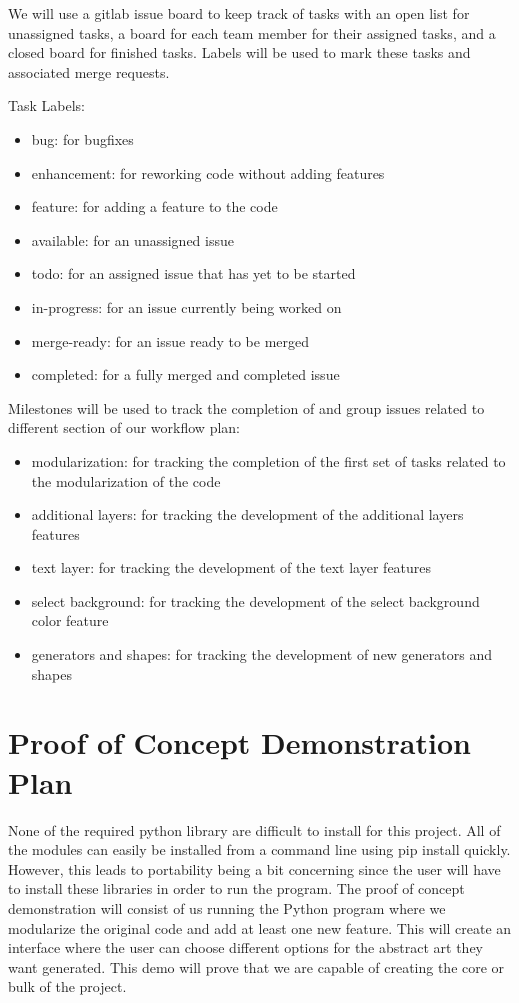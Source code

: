 \documentclass{article}
\begin{document}
We will use a gitlab issue board to keep track of tasks with an open list for unassigned tasks, a board for each team member for their assigned tasks, and a closed board for finished tasks. Labels will be used to mark these tasks and associated merge requests.\newline

Task Labels:

\begin{itemize}
    \item bug: for bugfixes
    \item enhancement: for reworking code without adding features
    \item feature: for adding a feature to the code
    \item available: for an unassigned issue
    \item todo: for an assigned issue that has yet to be started
    \item in-progress: for an issue currently being worked on
    \item merge-ready: for an issue ready to be merged
    \item completed: for a fully merged and completed issue
\end{itemize}

Milestones will be used to track the completion of and group issues related to different section of our workflow plan:

\begin{itemize}
    \item modularization: for tracking the completion of the first set of tasks related to the modularization of the code
    \item additional layers: for tracking the development of the additional layers features
    \item text layer: for tracking the development of the text layer features
    \item select background: for tracking the development of the select background color feature
    \item generators and shapes: for tracking the development of new generators and shapes
\end{itemize}

\section{Proof of Concept Demonstration Plan}

None of the required python library are difficult to install for this project. All of the modules can easily be installed from a command line using pip install quickly. However, this leads to portability being a bit concerning since the user will have to install these libraries in order to run the program. The proof of concept demonstration will consist of us running the Python program where we modularize the original code and add at least one new feature. This will create an interface where the user can choose different options for the abstract art they want generated. This demo will prove that we are capable of creating the core or bulk of the project.
\end{document}
